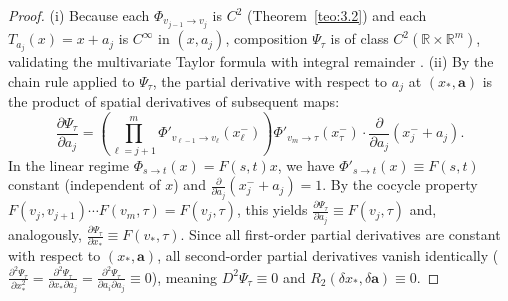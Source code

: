 \documentclass[11pt, a4paper]{article}
\theoremstyle{definition}
\theoremstyle{plain}
\theoremstyle{remark}
\begin{document}
\begin{proof}
(i) Because each $\Phi_{v_{j-1} \to v_j}$ is $C^2$ (Theorem~\ref{teo:3.2}) and each $T_{a_j}(x) = x + a_j$ is $C^\infty$ in $(x, a_j)$, composition $\Psi_\tau$ is of class $C^2(\mathbb{R} \times \mathbb{R}^m)$, validating the multivariate Taylor formula with integral remainder \cite[vol.~2]{LimaAnalise2}.
(ii) By the chain rule applied to $\Psi_\tau$, the partial derivative with respect to $a_j$ at $(x_*, \mathbf{a})$ is the product of spatial derivatives of subsequent maps:
\[
\frac{\partial \Psi_\tau}{\partial a_j} = \left(\prod_{\ell = j+1}^{m} \Phi'_{v_{\ell-1} \to v_\ell}(x_\ell^-)\right) \Phi'_{v_m \to \tau}(x_\tau^-) \cdot \frac{\partial}{\partial a_j}(x_j^- + a_j).
\]
In the linear regime $\Phi_{s \to t}(x) = F(s,t)x$, we have $\Phi'_{s \to t}(x) \equiv F(s,t)$ constant (independent of $x$) and $\frac{\partial}{\partial a_j}(x_j^- + a_j) = 1$. By the cocycle property $F(v_j, v_{j+1})\cdots F(v_m, \tau) = F(v_j, \tau)$, this yields $\frac{\partial \Psi_\tau}{\partial a_j} \equiv F(v_j, \tau)$ and, analogously, $\frac{\partial \Psi_\tau}{\partial x_*} \equiv F(v_*, \tau)$. Since all first-order partial derivatives are constant with respect to $(x_*, \mathbf{a})$, all second-order partial derivatives vanish identically ($\frac{\partial^2 \Psi_\tau}{\partial x_*^2} = \frac{\partial^2 \Psi_\tau}{\partial x_* \partial a_j} = \frac{\partial^2 \Psi_\tau}{\partial a_i \partial a_j} \equiv 0$), meaning $D^2 \Psi_\tau \equiv 0$ and $R_2(\delta x_*, \delta\mathbf{a}) \equiv 0$.
\end{proof}
\end{document}
